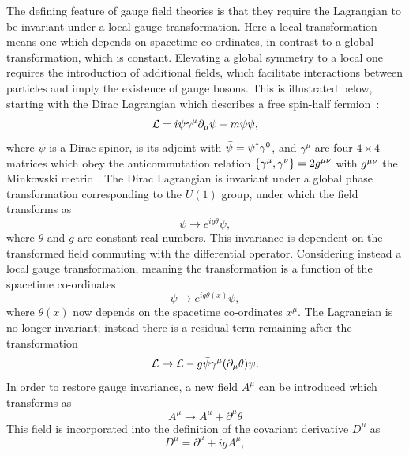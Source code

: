 The defining feature of gauge field theories is that they require the Lagrangian 
to be invariant under a local gauge transformation.
Here a local transformation means one which depends on spacetime co-ordinates, 
in contrast to a global transformation, which is constant.
Elevating a global symmetry to a local one requires the introduction of additional fields, 
which facilitate interactions between particles and imply the existence of gauge bosons.
This is illustrated below, starting with the Dirac Lagrangian 
which describes a free spin-half fermion~\cite{Dirac,Griffiths}:
\begin{equation}
\mathcal{L} = i \bar{\psi} \gamma^\mu \partial_\mu \psi - m\bar{\psi}\psi ,
\end{equation}
where $\psi$ is a Dirac spinor, \psibar is its adjoint with $\bar{\psi} = \psi^\dagger \gamma^0$, 
and $\gamma^\mu$ are four $4\times4$ matrices which obey the anticommutation relation
$\{\gamma^\mu,\gamma^\nu\} = 2g^{\mu\nu}$ with $g^{\mu\nu}$ the Minkowski metric~\cite{Griffiths}.
The Dirac Lagrangian is invariant under a global phase transformation 
corresponding to the $U(1)$ group, under which the field transforms as
\begin{equation}
\psi \rightarrow e^{ig\theta} \psi ,
\end{equation}
where $\theta$ and $g$ are constant real numbers.
This invariance is dependent on the transformed field commuting with the differential operator. 
Considering instead a local gauge transformation, 
meaning the transformation is a function of the spacetime co-ordinates
\begin{equation}
\psi \rightarrow e^{ig\theta(x)} \psi , 
\end{equation}
where $\theta(x)$ now depends on the spacetime co-ordinates $x^\mu$.
The Lagrangian is no longer invariant;
instead there is a residual term remaining after the transformation
\begin{equation}
\mathcal{L} \rightarrow \mathcal{L} - g \bar{\psi} \gamma^\mu (\partial_\mu \theta) \psi .
\end{equation}
In order to restore gauge invariance, a new field $A^{\mu}$ can be introduced 
which transforms as
\begin{equation}
A^\mu \rightarrow A^\mu + \partial^\mu \theta
\end{equation}
This field is incorporated into the definition of the covariant derivative $D^\mu$ as
\begin{equation}
\label{eq:theory_covdev}
D^\mu = \partial^\mu + i g A^\mu , 
\end{equation}
